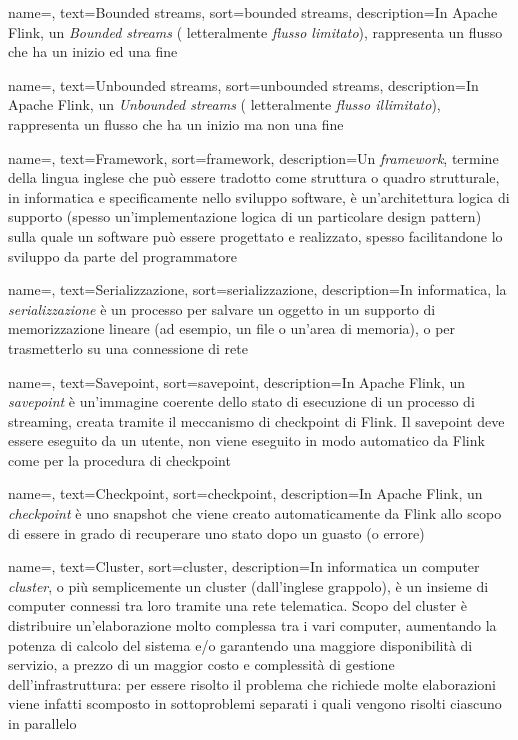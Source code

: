 {
    name=,
    text=Bounded streams,
    sort=bounded streams,
    description={In Apache Flink, un \textit{Bounded streams} ( letteralmente \textit{flusso limitato}), rappresenta un flusso che ha un inizio ed una fine}
}

{
    name=,
    text=Unbounded streams,
    sort=unbounded streams,
    description={In Apache Flink, un \textit{Unbounded streams} ( letteralmente \textit{flusso illimitato}), rappresenta un flusso che ha un inizio ma non una fine}
}

{
    name=,
    text=Framework,
    sort=framework,
    description={Un \textit{framework}, termine della lingua inglese che può essere tradotto come struttura o quadro strutturale, in informatica e specificamente nello sviluppo software, è un'architettura logica di supporto (spesso un'implementazione logica di un particolare design pattern) sulla quale un software può essere progettato e realizzato, spesso facilitandone lo sviluppo da parte del programmatore}
}


{
    name=,
    text=Serializzazione,
    sort=serializzazione,
    description={In informatica, la \textit{serializzazione} è un processo per salvare un oggetto in un supporto di memorizzazione lineare (ad esempio, un file o un'area di memoria), o per trasmetterlo su una connessione di rete}
}

{
    name=,
    text=Savepoint,
    sort=savepoint,
    description={In Apache Flink, un \textit{savepoint} è un'immagine coerente dello stato di esecuzione di un processo di streaming, creata tramite il meccanismo di \gls{checkpoint} di Flink. Il savepoint deve essere eseguito da un utente, non viene eseguito in modo automatico da Flink come per la procedura di \gls{checkpoint}}
}


{
    name=,
    text=Checkpoint,
    sort=checkpoint,
    description={In Apache Flink, un \textit{checkpoint} è uno snapshot che viene creato automaticamente da Flink allo scopo di essere in grado di recuperare uno stato dopo un guasto (o errore)}
}

{
    name=,
    text=Cluster,
    sort=cluster,
    description={In informatica un computer \textit{cluster}, o più semplicemente un cluster (dall'inglese grappolo), è un insieme di computer connessi tra loro tramite una rete telematica. Scopo del cluster è distribuire un'elaborazione molto complessa tra i vari computer, aumentando la potenza di calcolo del sistema e/o garantendo una maggiore disponibilità di servizio, a prezzo di un maggior costo e complessità di gestione dell'infrastruttura: per essere risolto il problema che richiede molte elaborazioni viene infatti scomposto in sottoproblemi separati i quali vengono risolti ciascuno in parallelo}
}

